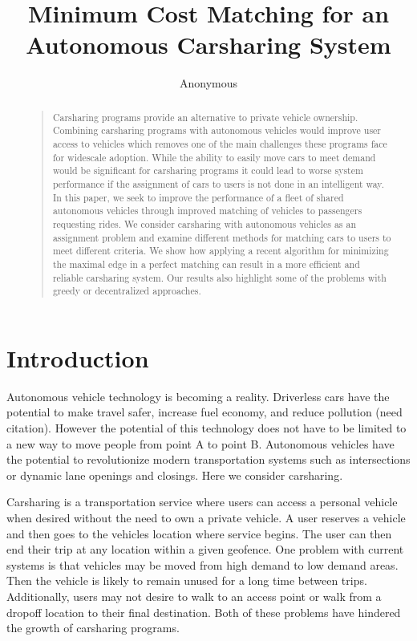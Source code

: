 \documentclass[letterpaper]{article}
\begin{document}
%
\title{Minimum Cost Matching for an Autonomous Carsharing System}
\author{Anonymous}
\maketitle
\begin{abstract}
\begin{quote}
Carsharing programs provide an alternative to private vehicle ownership. Combining carsharing programs with autonomous vehicles would improve user access to vehicles which removes one of the main challenges these programs face for widescale adoption. While the ability to easily move cars to meet demand would be significant for carsharing programs it could lead to worse system performance if the assignment of cars to users is not done in an intelligent way. In this paper, we seek to improve the performance of a fleet of shared autonomous vehicles through improved matching of vehicles to passengers requesting rides. We consider carsharing with autonomous vehicles as an assignment problem and examine different methods for matching cars to users to meet different criteria. We show how applying a recent algorithm for minimizing the maximal edge in a perfect matching can result in a more efficient and reliable carsharing system. Our results also highlight some of the problems with greedy or decentralized approaches.
\end{quote}
\end{abstract}

\noindent 

\section{Introduction}
Autonomous vehicle technology is becoming a reality. Driverless cars have the potential to make travel safer, increase fuel economy, and reduce pollution (need citation). However the potential of this technology does not have to be limited to a new way to move people from point A to point B. Autonomous vehicles have the potential to revolutionize modern transportation systems such as intersections or dynamic lane openings and closings. Here we consider carsharing.

Carsharing is a transportation service where users can access a personal vehicle when desired without the need to own a private vehicle. A user reserves a vehicle and then goes to the vehicles location where service begins. The user can then end their trip at any location within a given geofence. One problem with current systems is that vehicles may be moved from high demand to low demand areas. Then the vehicle is likely to remain unused for a long time between trips. Additionally, users may not desire to walk to an access point or walk from a dropoff location to their final destination. Both of these problems have hindered the growth of carsharing programs.
\end{document}
